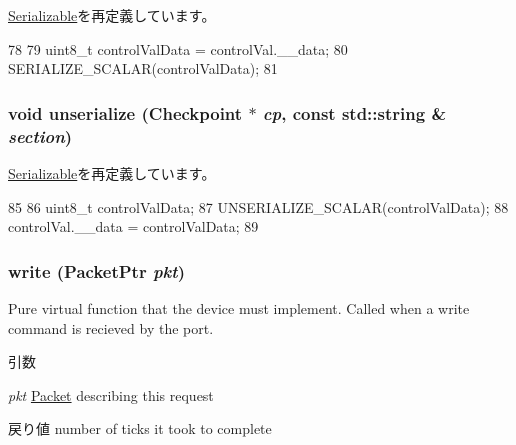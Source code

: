 \hyperlink{classSerializable_ad6272f80ae37e8331e3969b3f072a801}{Serializable}を再定義しています。


\begin{DoxyCode}
78 {
79     uint8_t controlValData = controlVal.__data;
80     SERIALIZE_SCALAR(controlValData);
81 }
\end{DoxyCode}
\hypertarget{classX86ISA_1_1Speaker_af22e5d6d660b97db37003ac61ac4ee49}{
\subsubsection[{unserialize}]{\setlength{\rightskip}{0pt plus 5cm}void unserialize ({\bf Checkpoint} $\ast$ {\em cp}, \/  const std::string \& {\em section})}}
\label{classX86ISA_1_1Speaker_af22e5d6d660b97db37003ac61ac4ee49}


\hyperlink{classSerializable_af100c4e9feabf3cd918619c88c718387}{Serializable}を再定義しています。


\begin{DoxyCode}
85 {
86     uint8_t controlValData;
87     UNSERIALIZE_SCALAR(controlValData);
88     controlVal.__data = controlValData;
89 }
\end{DoxyCode}
\hypertarget{classX86ISA_1_1Speaker_a4cefab464e72b5dd42c003a0a4341802}{
\subsubsection[{write}]{ write ({\bf PacketPtr} {\em pkt})}}
\label{classX86ISA_1_1Speaker_a4cefab464e72b5dd42c003a0a4341802}
Pure virtual function that the device must implement. Called when a write command is recieved by the port. 
\begin{DoxyParams}{引数}
\item[{\em pkt}]\hyperlink{classPacket}{Packet} describing this request \end{DoxyParams}
\begin{DoxyReturn}{戻り値}
number of ticks it took to complete 
\end{DoxyReturn}


